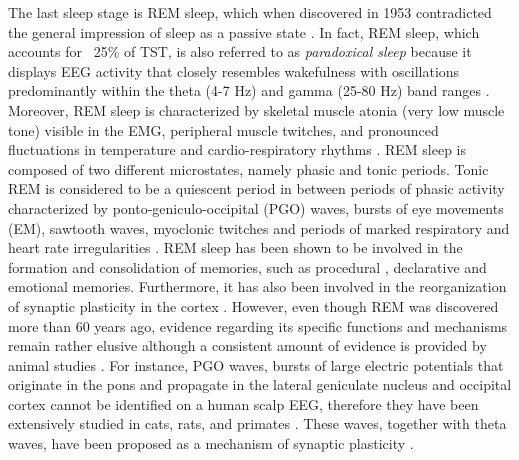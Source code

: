The last sleep stage is REM sleep, which when discovered in 1953 contradicted the general impression of sleep as a passive state \parencite{aserinsky_regularly_1953}. In fact, REM sleep, which accounts for ~25\% of TST, is also referred to as \textit{paradoxical sleep} because it displays EEG activity that closely resembles wakefulness with oscillations predominantly within the theta (4-7 Hz) and gamma (25-80 Hz) band ranges \parencite{iber_aasm_2007,steriade_synchronization_1996}. Moreover, REM sleep is characterized by skeletal muscle atonia (very low muscle tone) visible in the EMG, peripheral muscle twitches, and pronounced fluctuations in temperature and cardio-respiratory rhythms \parencite{peever_biology_2017}. REM sleep is composed of two different microstates, namely phasic and tonic periods. Tonic REM is considered to be a quiescent period in between periods of phasic activity characterized by ponto-geniculo-occipital (PGO) waves, bursts of eye movements (EM), sawtooth waves, myoclonic twitches and periods of marked respiratory and heart rate irregularities \parencite{simor_microstructure_2020}. REM sleep has been shown to be involved in the formation and consolidation of memories, such as procedural \parencite{peigneux_learned_2003}, declarative \parencite{fogel_dissociable_2007} and emotional \parencite{helm_overnight_2010} memories. Furthermore, it has also been involved in the reorganization of synaptic plasticity in the cortex \parencite{almeida-filho_memory_2018, pereira_differing_2020,zhou_rem_2020}. However, even though REM was discovered more than 60 years ago, evidence regarding its specific functions and mechanisms remain rather elusive although a consistent amount of evidence is provided by animal studies \parencite[e.g.,][]{peever_biology_2017, rasch_about_2013,simor_microstructure_2020}. For instance, PGO waves, bursts of large electric potentials that originate in the pons and propagate in the lateral geniculate nucleus and occipital cortex cannot be identified on a human scalp EEG, therefore they have been extensively studied in cats, rats, and primates \parencite{gott_towards_2017}. These waves, together with theta waves, have been proposed as a mechanism of synaptic plasticity \parencite{rasch_about_2013}.

